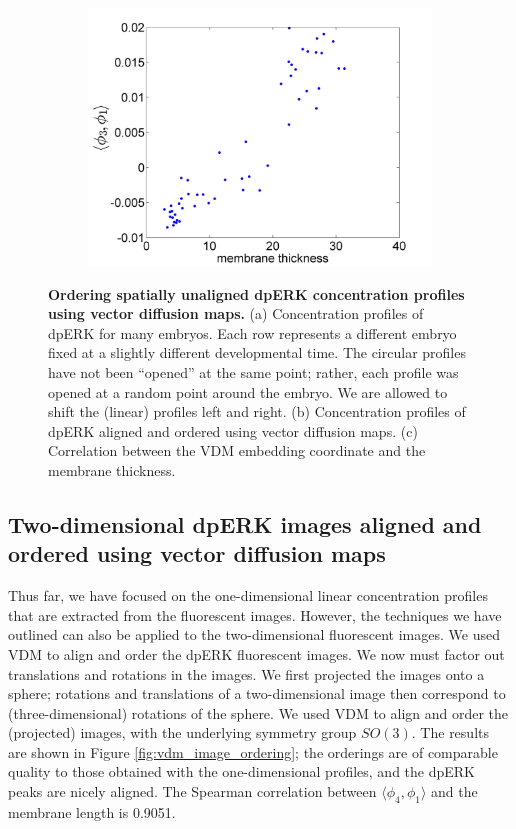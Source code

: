 \documentclass[10pt]{article}
\begin{document}
\begin{figure}[!ht]
\begin{subfigure}{0.3\textwidth}
\includegraphics[width=\textwidth]{VDM_time_corr}
\caption{}
\end{subfigure}
\caption{{\bf Ordering spatially unaligned dpERK concentration profiles using vector diffusion maps.} (a) Concentration profiles of dpERK for many embryos. Each row represents a different embryo fixed at a slightly different developmental time. The circular profiles have not been ``opened'' at the same point; rather, each profile was opened at a random point around the embryo. We are allowed to shift the (linear) profiles left and right.
(b) Concentration profiles of dpERK aligned and ordered using vector diffusion maps.
(c) Correlation between the VDM embedding coordinate and the membrane thickness.}
\label{fig:vdm_ordering}
\end{figure}

\subsection*{Two-dimensional dpERK images aligned and ordered using vector diffusion maps}

Thus far, we have focused on the one-dimensional linear concentration profiles that are extracted from the fluorescent images.
%
However, the techniques we have outlined can also be applied to the two-dimensional fluorescent images. 
%
We used VDM to align and order the dpERK fluorescent images. 
%
We now must factor out translations and rotations in the images. 
%
We first projected the images onto a sphere;
rotations and translations of a two-dimensional image then correspond to (three-dimensional) rotations of the sphere.
%
We used VDM to align and order the (projected) images, with the underlying symmetry group $SO(3)$. 
%
The results are shown in Figure \ref{fig:vdm_image_ordering};
the orderings are of comparable quality to those obtained with the one-dimensional profiles, and the dpERK peaks are nicely aligned.
%
The Spearman correlation between $\langle \phi_4, \phi_1 \rangle$ and the membrane length is 0.9051.
\end{document}
